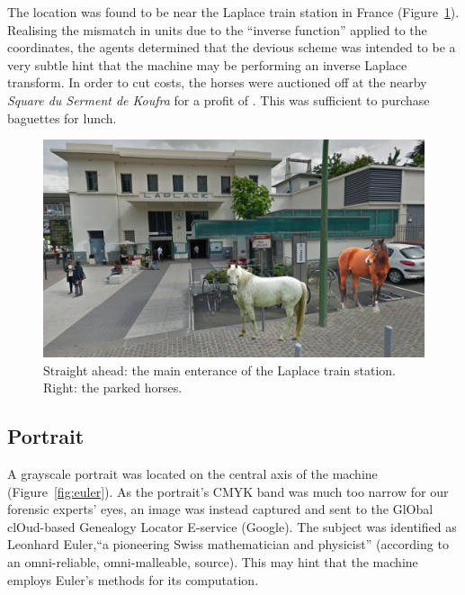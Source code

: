 The location was found to be near the Laplace train station in France (Figure~\ref{fig:laplace-horses}). Realising the mismatch in units due to the ``inverse function'' applied to the coordinates, the agents determined that the devious scheme was intended to be a very subtle hint that the machine may be performing an inverse Laplace transform. In order to cut costs, the horses were auctioned off at the nearby \emph{Square du Serment de Koufra} for a profit of . This was sufficient to purchase baguettes for lunch.

\begin{figure}[h]
	\centering
	\includegraphics[width=0.95\columnwidth]{img/laplace-horses.jpg}
	\caption{Straight ahead: the main enterance of the Laplace train station. Right: the parked horses.}
	\label{fig:laplace-horses}
\end{figure}



\subsection{Portrait}
\newcommand{\google}{\textcolor{google-blue}{G}\textcolor{google-red}{o}\textcolor{google-yellow}{o}\textcolor{google-blue}{g}\textcolor{google-green}{l}\textcolor{google-red}{e}}

A grayscale portrait was located on the central axis of the machine (Figure~\ref{fig:euler}). As the portrait's CMYK band was much too narrow for our forensic experts' eyes, an image was instead captured and sent to the \textcolor{google-blue}{G}l\textcolor{google-red}{O}bal cl\textcolor{google-yellow}{O}ud-based \textcolor{google-blue}{G}enealogy \textcolor{google-green}{L}ocator \textcolor{google-red}{E}-service (\google). The subject was identified as Leonhard Euler,``a pioneering Swiss mathematician and physicist'' (according to an omni-reliable, omni-malleable, source). This may hint that the machine employs Euler's methods for its computation.

